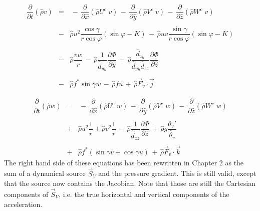 \begin{eqnarray}
\dfrac{\partial}{\partial t}(\widehat{\rho}  v ) &= &
 \, - \, \dfrac{\partial }{\partial \widehat{x}} (\widehat{\rho} U^{c }\;    v )
 \, - \, \dfrac{\partial }{\partial \widehat{y}} (\widehat{\rho} V^{c }\;    v )
 \, - \, \dfrac{\partial }{\partial \widehat{z}} (\widehat{\rho} W^{c } \;    v )
\nonumber \\ & & \nonumber \\
&  - & \widehat{\rho}  u ^{2}  \dfrac{ \cos\gamma}{r\cos\varphi} (\sin\varphi -K)
 \, - \, \widehat{\rho}  u   v \dfrac{\sin\gamma}{r\cos\varphi} (\sin\varphi -K)
\nonumber \\ & & \nonumber \\
 & - & \widehat{\rho}\dfrac{ v  w}{r} \,  - \, \widehat{\rho}\dfrac{1}{\widehat{d}_{yy}} \dfrac{\partial \Phi}{\partial \widehat{y}}
 \, +  \, \widehat{\rho}\dfrac{\widehat{d}_{zy}}{\widehat{d}_{yy}\widehat{d}_{zz}} \dfrac{\partial \Phi}{\partial \widehat{z}} \nonumber \\
& & \nonumber \\
&  - & \widehat{\rho} f^{*} \sin\gamma w  \, - \,  \widehat{\rho} f  u
 \,+ \, \widehat{\rho} \vec{F}_{v} \cdot\vec{j}
\end{eqnarray}


\begin{eqnarray}
\dfrac{\partial}{\partial t}(\widehat{\rho} w) &= &
 \, - \, \dfrac{\partial }{\partial \widehat{x}} (\widehat{\rho} U^{c } \;   w)
 \, - \, \dfrac{\partial }{\partial \widehat{y}} (\widehat{\rho} V^{c } \;   w )
 \, - \, \dfrac{\partial }{\partial \widehat{z}} (\widehat{\rho} W^{c } \;   w)
\nonumber \\ & & \nonumber \\
 & + & \widehat{\rho} u ^{2} \dfrac{1}{r}+
\widehat{\rho}  v ^{2}\dfrac{1}{r}
 \,  - \, \widehat{\rho}\dfrac{1}{\widehat{d}_{zz}} \dfrac{\partial \Phi}{\partial \widehat{z}}
\, + \,\widehat{\rho} g \dfrac{\theta_v ' }{\widehat{\theta}_v}\nonumber \\
& & \nonumber \\
&  + & \widehat{\rho} f^{*}(\sin\gamma  v  + \cos\gamma  u )
 \,+ \, \widehat{\rho} \vec{F}_{v} \cdot \vec{k}
\end{eqnarray}
The right hand side of these equations has been rewritten in Chapter 2 as
the sum of a dynamical source $\vec{S}_V$ and the pressure gradient. This
is still valid, except that the source now contains the Jacobian. Note
that those are still the Cartesian components of $\vec{S}_V$,
i.e. the true horizontal and vertical components of the acceleration.

